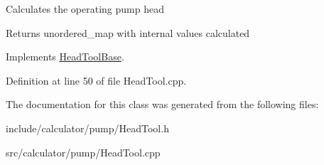 Calculates the operating pump head \begin{DoxyReturn}{Returns}
unordered\+\_\+map with internal values calculated 
\end{DoxyReturn}


Implements \hyperlink{class_head_tool_base_ab8df8f908827ce45dc5e769ea0e10f0b}{Head\+Tool\+Base}.



Definition at line 50 of file Head\+Tool.\+cpp.



The documentation for this class was generated from the following files\+:\begin{DoxyCompactItemize}
\item 
include/calculator/pump/Head\+Tool.\+h\item 
src/calculator/pump/Head\+Tool.\+cpp\end{DoxyCompactItemize}
